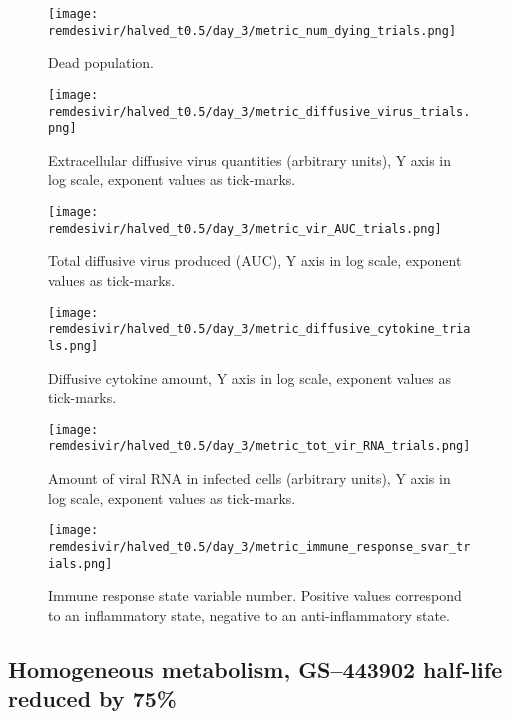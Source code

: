 \begin{figure}[H]
\texttt{[image: remdesivir/halved\_t0.5/day\_3/metric\_num\_dying\_trials.png]}
\caption{Dead population.\label{fig:app:homo_halved:day3:dead}}
\end{figure}

\begin{figure}[H]
\texttt{[image: remdesivir/halved\_t0.5/day\_3/metric\_diffusive\_virus\_trials.png]}
\caption{Extracellular diffusive virus quantities (arbitrary units), Y axis in log scale, exponent values as tick-marks.\label{fig:app:homo_halved:day3:diff_vir}}
\end{figure}



\begin{figure}[H]
\texttt{[image: remdesivir/halved\_t0.5/day\_3/metric\_vir\_AUC\_trials.png]}
\caption{Total diffusive virus produced (AUC), Y axis in log scale, exponent values as tick-marks.\label{fig:app:homo_halved:day3:auc_vir}}
\end{figure}

\begin{figure}[H]
\texttt{[image: remdesivir/halved\_t0.5/day\_3/metric\_diffusive\_cytokine\_trials.png]}
\caption{Diffusive cytokine amount, Y axis in log scale, exponent values as tick-marks.\label{fig:app:homo_halved:day3:diff_cyto}}
\end{figure}

\begin{figure}[H]
\texttt{[image: remdesivir/halved\_t0.5/day\_3/metric\_tot\_vir\_RNA\_trials.png]}
\caption{Amount of viral RNA in infected cells (arbitrary units), Y axis in log scale, exponent values as tick-marks.\label{fig:app:homo_halved:day3:vir_RNA}}
\end{figure}

\begin{figure}[H]
\texttt{[image: remdesivir/halved\_t0.5/day\_3/metric\_immune\_response\_svar\_trials.png]}
\caption{Immune response state variable number. Positive values correspond to an inflammatory state, negative to an anti-inflammatory state.\label{fig:app:homo_halved:day3:immune_var}}
\end{figure}

\clearpage
\subsection{Homogeneous metabolism, GS--443902 half-life reduced by 75\%}\label{sup:sec:extra_figures:homo_quartered}
